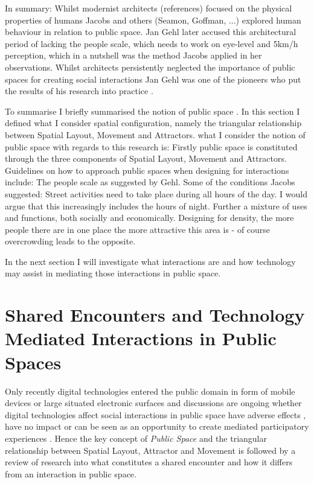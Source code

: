 
In summary: Whilst modernist architects (references) focused on the physical properties of humans Jacobs and others (Seamon, Goffman, ...) explored human behaviour in relation to public space. 
Jan Gehl later accused this architectural period of lacking the people scale, which needs to work on eye-level and 5km/h perception, which in a nutshell was the method Jacobs applied in her observations. Whilst architects persistently neglected the importance of public spaces for creating social interactions Jan Gehl was one of the pioneers who put the results of his research into practice \cite{Gehl_2013}. 

To summarise 
I briefly summarised the notion of public space .
In this section I defined what I consider spatial configuration, namely the triangular relationship between Spatial Layout, Movement and Attractors. 
what I consider the notion of public space with regards to this research is: 
Firstly public space is constituted through the three components of Spatial Layout, Movement and Attractors. 
Guidelines on how to approach public spaces when designing for interactions include:
The people scale as suggested by Gehl.
Some of the conditions Jacobs suggested:
Street activities need to take place during all hours of the day. I would argue that this increasingly includes the hours of night. Further a mixture of uses and functions, both socially and economically. 
Designing for density, the more people there are in one place the more attractive this area is - of course overcrowding leads to the opposite. 

In the next section I will investigate what interactions are and how technology may assist in mediating those interactions in public space.



\section{Shared Encounters and Technology Mediated Interactions in Public Spaces}

Only recently digital technologies entered the public domain in form of mobile devices or large situated electronic surfaces and discussions are ongoing whether digital technologies affect social interactions in public space have adverse effects \cite{Turkle_2012}, have no impact \cite{Hampton_2015} or can be seen as an opportunity to create mediated participatory experiences \cite{Gordon_2011}. Hence the key concept of \textit{Public Space} and the triangular relationship between Spatial Layout, Attractor and Movement is followed by a review of research into what constitutes a shared encounter and how it differs from an interaction in public space.

